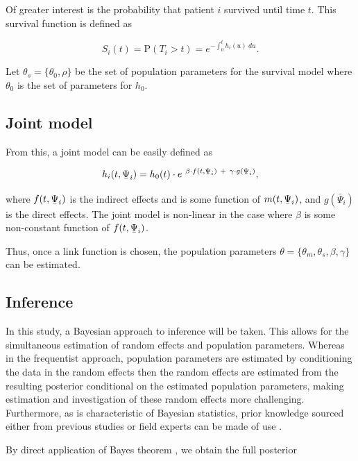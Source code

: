 \documentclass[english]{article}
\newcommand{\ubar}[1]{\text{\b{$#1$}}}
\theoremstyle{plain}
\begin{document}
Of greater interest is the probability that patient $i$ survived until time $t$. This survival function is defined as

\begin{equation}
S_i(t) = \mathrm{P}(T_i > t) = e^{ - \int_{0}^{t} h_i(u)\ du}.
\end{equation}

Let $\theta_s = \{\theta_0, \rho\}$ be the set of population parameters for the survival model where $\theta_0$ is the set of parameters for $h_0$.

\subsection{Joint model}

From this, a joint model can be easily defined as 

\begin{equation}
h_i(t, \ubar{\Psi}_i) = h_0(t) \cdot e^{\ \beta \cdot  f(t, \ubar{\Psi}_i)\ +\ \gamma \cdot g(\ubar{\Psi}_i)},
\end{equation}

where $f(t, \ubar{\Psi}_i)$ is the indirect effects and is some function of $m(t, \ubar{\Psi}_i)$, and $g(\bar{\Psi}_i)$ is the direct effects.
The joint model is non-linear in the case where $\beta$ is some non-constant function of $f(t, \ubar{\Psi}_i)$.

Thus, once a link function is chosen, the population parameters $\theta = \{\theta_m, \theta_s, \beta, \gamma \}$ can be estimated.

\subsection{Inference}

In this study, a Bayesian approach to inference \cite{Gelman2016} will be taken. This allows for the simultaneous estimation of random effects and population parameters. Whereas in the frequentist approach, population parameters are estimated by conditioning the data in the random effects then the random effects are estimated from the resulting posterior conditional on the estimated population parameters, making estimation and investigation of these random effects more challenging. Furthermore, as is characteristic of Bayesian statistics, prior knowledge sourced either from previous studies or field experts can be made of use \cite{Marion2022}.

By direct application of Bayes theorem \cite{bay}, we obtain the full posterior
\end{document}
